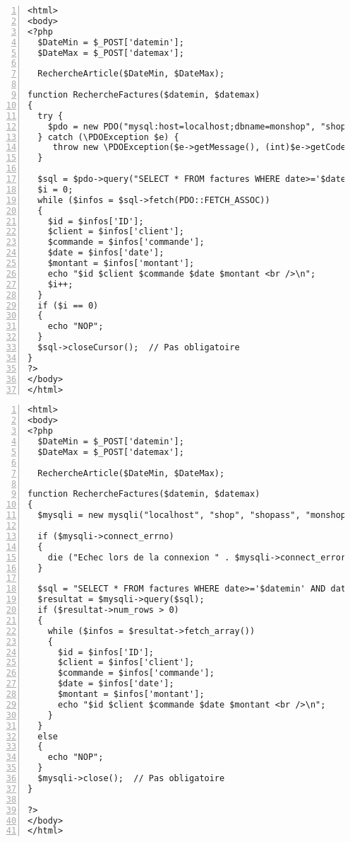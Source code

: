 \documentclass[11pt,a4paper]{article}
\begin{document}
\medskip

\newpage

\lstset{language=php}
\begin{lstlisting}[frame=single,numbers=left]
<html>
<body>
<?php
  $DateMin = $_POST['datemin'];
  $DateMax = $_POST['datemax'];

  RechercheArticle($DateMin, $DateMax);

function RechercheFactures($datemin, $datemax)
{
  try {
    $pdo = new PDO("mysql:host=localhost;dbname=monshop", "shop", "shopass");
  } catch (\PDOException $e) {
     throw new \PDOException($e->getMessage(), (int)$e->getCode());
  }

  $sql = $pdo->query("SELECT * FROM factures WHERE date>='$datemin' AND date<='$datemax'");
  $i = 0;
  while ($infos = $sql->fetch(PDO::FETCH_ASSOC))
  {
    $id = $infos['ID'];
    $client = $infos['client'];
    $commande = $infos['commande'];
    $date = $infos['date'];
    $montant = $infos['montant'];
    echo "$id $client $commande $date $montant <br />\n";
    $i++;
  }
  if ($i == 0)
  {
    echo "NOP";
  }
  $sql->closeCursor();  // Pas obligatoire
}
?>
</body>
</html>
\end{lstlisting}

\medskip

\newpage

\lstset{language=php}
\begin{lstlisting}[frame=single,numbers=left]
<html>
<body>
<?php
  $DateMin = $_POST['datemin'];
  $DateMax = $_POST['datemax'];

  RechercheArticle($DateMin, $DateMax);

function RechercheFactures($datemin, $datemax)
{
  $mysqli = new mysqli("localhost", "shop", "shopass", "monshop"); // fab / passbdd

  if ($mysqli->connect_errno)
  {
    die ("Echec lors de la connexion " . $mysqli->connect_error);
  }

  $sql = "SELECT * FROM factures WHERE date>='$datemin' AND date<='$datemax'";
  $resultat = $mysqli->query($sql);
  if ($resultat->num_rows > 0)
  {
    while ($infos = $resultat->fetch_array())
    {
      $id = $infos['ID'];
      $client = $infos['client'];
      $commande = $infos['commande'];
      $date = $infos['date'];
      $montant = $infos['montant'];
      echo "$id $client $commande $date $montant <br />\n";
    }
  }
  else
  {
    echo "NOP";
  }
  $mysqli->close();  // Pas obligatoire
}

?>
</body>
</html>
\end{lstlisting}
\end{document}
